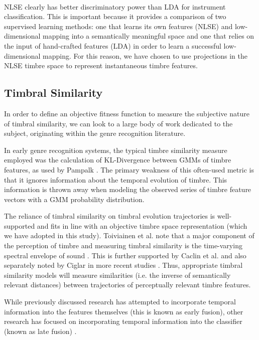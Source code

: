 \documentclass[a4paper,12pt]{report} 	%
\numberwithin{figure}{chapter}
\numberwithin{table}{chapter}
\numberwithin{equation}{chapter}
\begin{document}
\begin{flushleft}
\begin{figure}[h!]
\begin{center}
\end{center}
\end{figure}
\\
NLSE clearly has better discriminatory power than LDA for instrument classification. This is important because it provides a comparison of two supervised learning methods: one that learns its own features (NLSE) and low-dimensional mapping into a semantically meaningful space and one that relies on the input of hand-crafted features (LDA) in order to learn a successful low-dimensional mapping. For this reason, we have chosen to use projections in the NLSE timbre space to represent instantaneous timbre features.

\subsection{Timbral Similarity}

In order to define an objective fitness function to measure the subjective nature of timbral similarity, we can look to a large body of work dedicated to the subject, originating within the genre recognition literature.

In early genre recognition systems, the typical timbre similarity measure employed was the calculation of KL-Divergence between GMMs of timbre features, as used by Pampalk \cite{Pampalk:2006pr}. The primary weakness of this often-used metric is that it ignores information about the temporal evolution of timbre. This information is thrown away when modeling the observed series of timbre feature vectors with a GMM probability distribution. 

The reliance of timbral similarity on timbral evolution trajectories is well-supported and fits in line with an objective timbre space representation (which we have adopted in this study). Toiviainen et al. note that a major component of the perception of timbre and measuring timbral similarity is the time-varying spectral envelope of sound \cite[p.225]{Toiviainen:1998hs}. This is further supported by Caclin et al. and also separately noted by Ciglar in more recent studies \cite[p. 1]{Caclin:2005il} \cite[p. 4]{Ciglar:2009uf}. Thus, appropriate timbral similarity models will measure similarities (i.e. the inverse of semantically relevant distances) between trajectories of perceptually relevant timbre features. 

While previously discussed research has attempted to incorporate temporal information into the features themselves (this is known as early fusion), other research has focused on incorporating temporal information into the classifier (known as late fusion) \cite[p. 500]{Meng:2005fx}.


\end{flushleft}
\end{document}
